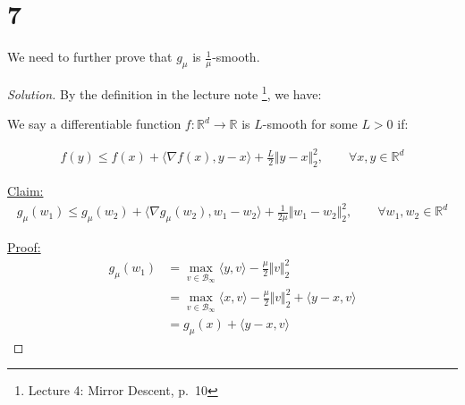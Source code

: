 \documentclass{article}
\newenvironment{solution}
  {\renewcommand\qedsymbol{$\blacksquare$}\begin{proof}[Solution]}
  {\end{proof}}
\newenvironment{claim}[1]{\par\noindent\underline{Claim:}\space#1}{}
\newenvironment{claimproof}[1]{\par\noindent\underline{Proof:}\space#1}{}
\begin{document}
\section*{7}

We need to further prove that $g_\mu$ is $\frac{1}{\mu}$-smooth.

\begin{solution}

    By the definition in the lecture note
    \footnote{Lecture 4: Mirror Descent, p.~10}, we have:

    \begin{tcolorbox}[bluebox, title = $L$-Smooth]
        We say a differentiable function $f: \mathbb{R}^d \to \mathbb{R}$ is $L$-smooth for some $L > 0$ if:

        \begin{align*}
            f(y) \leq f(x) + \langle \nabla f(x), y - x \rangle + \frac{L}{2} \Vert y - x \Vert_2^2, \qquad \forall x, y \in \mathbb{R}^d
        \end{align*}
    \end{tcolorbox}

    \begin{claim}
        \begin{align*}
            g_\mu(w_1) \leq g_\mu(w_2) + \langle \nabla g_\mu(w_2), w_1 - w_2 \rangle + \frac{1}{2\mu} \Vert w_1 - w_2 \Vert_2^2, \qquad \forall w_1, w_2 \in \mathbb{R}^d
        \end{align*}
    \end{claim}

    \begin{claimproof}
        \begin{align*}
            g_\mu(w_1) 
            &= \max_{v \in \mathcal{B}_\infty} \langle y, v \rangle - \frac{\mu}{2} \Vert v \Vert^2_2 \\
            &= \max_{v \in \mathcal{B}_\infty} \langle x, v \rangle - \frac{\mu}{2} \Vert v \Vert^2_2 + \langle y - x, v \rangle \\
            &= g_\mu(x) + \langle y - x, v \rangle
        \end{align*}
    \end{claimproof}

\end{solution}
\end{document}
